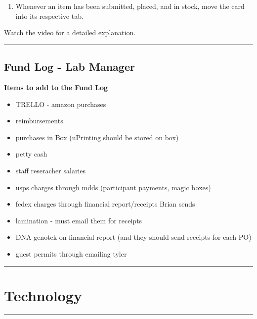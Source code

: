 \documentclass[]{book}
\providecommand{\tightlist}{%
  \setlength{\itemsep}{0pt}\setlength{\parskip}{0pt}}
\begin{document}
\begin{enumerate}
\def\labelenumi{\arabic{enumi}.}
\setcounter{enumi}{5}
\tightlist
\item
  Whenever an item has been submitted, placed, and in stock, move the card into its respective tab.
\end{enumerate}

Watch the video for a detailed explanation.

\begin{center}\rule{0.5\linewidth}{0.5pt}\end{center}

\hypertarget{fund-log---lab-manager}{%
\subsection{Fund Log - Lab Manager}\label{fund-log---lab-manager}}

\textbf{Items to add to the Fund Log}

\begin{itemize}
\tightlist
\item
  TRELLO - amazon purchases
\item
  reimbursements
\item
  purchases in Box (uPrinting should be stored on box)
\item
  petty cash
\item
  staff reseracher salaries
\item
  usps charges through mdds (participant payments, magic boxes)
\item
  fedex charges through financial report/receipts Brian sends
\item
  lamination - must email them for receipts
\item
  DNA genotek on financial report (and they should send receipts for each PO)
\item
  guest permits through emailing tyler
\end{itemize}

\begin{center}\rule{0.5\linewidth}{0.5pt}\end{center}

\hypertarget{technology}{%
\section{Technology}\label{technology}}

\begin{center}\rule{0.5\linewidth}{0.5pt}\end{center}
\end{document}
